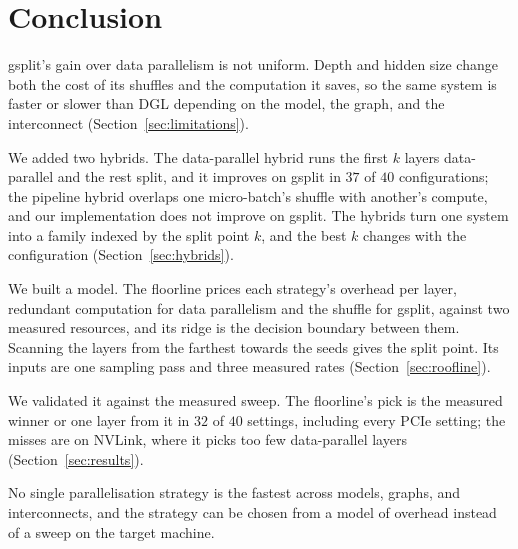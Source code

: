 \section{Conclusion}
\label{sec:conclusion}

gsplit's gain over data parallelism is not uniform. Depth and hidden size change both the cost of
its shuffles and the computation it saves, so the same system is faster or slower than DGL
depending on the model, the graph, and the interconnect (Section~\ref{sec:limitations}).

We added two hybrids. The data-parallel hybrid runs the first $k$ layers data-parallel and the
rest split, and it improves on gsplit in $37$ of $40$ configurations; the pipeline hybrid overlaps
one micro-batch's shuffle with another's compute, and our implementation does not improve on
gsplit. The hybrids turn one system into a family indexed by the split point $k$, and the best $k$
changes with the configuration (Section~\ref{sec:hybrids}).

We built a model. The floorline prices each strategy's overhead per layer, redundant computation
for data parallelism and the shuffle for gsplit, against two measured resources, and its ridge is
the decision boundary between them. Scanning the layers from the farthest towards the seeds gives the
split point. Its inputs are one sampling pass and three measured rates
(Section~\ref{sec:roofline}).

We validated it against the measured sweep. The floorline's pick is the measured winner or one
layer from it in $32$ of $40$ settings, including every PCIe setting; the misses are on NVLink,
where it picks too few data-parallel layers (Section~\ref{sec:results}).

No single parallelisation strategy is the fastest across models, graphs, and interconnects, and the
strategy can be chosen from a model of overhead instead of a sweep on the target machine.
